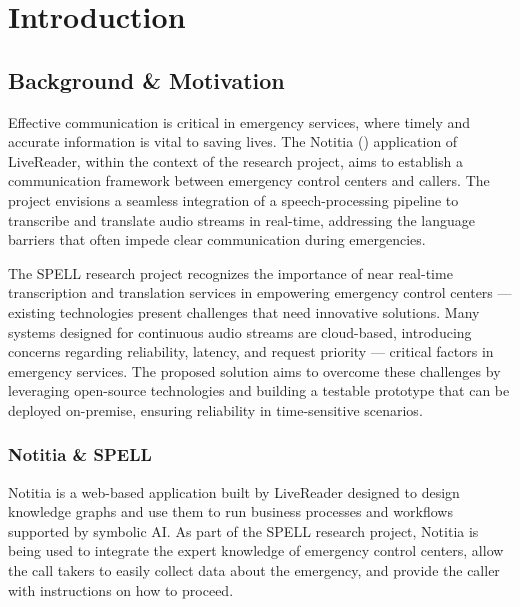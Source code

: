 \chapter{Introduction}

\label{Introduction}


\section{Background \& Motivation}

Effective communication is critical in emergency services, where timely and accurate information is vital to 
saving lives. The Notitia (\cite{notitia2023}) application of LiveReader, within the context of the 
\cite{spell2023} research project, aims to establish a communication framework between 
emergency control centers and callers. The project envisions a seamless integration of a speech-processing pipeline to 
transcribe and translate audio streams in real-time, addressing the language barriers that often impede clear 
communication during emergencies.

The SPELL research project recognizes the importance of near real-time transcription and translation services in 
empowering emergency control centers — existing technologies present challenges that need innovative solutions. 
Many systems designed for continuous audio streams are cloud-based, introducing concerns regarding reliability, 
latency, and request priority — critical factors in emergency services. The proposed solution aims to 
overcome these challenges by leveraging open-source technologies and building a testable prototype that can be deployed 
on-premise, ensuring reliability in time-sensitive scenarios.

\subsection{Notitia \& SPELL}

Notitia is a web-based application built by LiveReader designed to design knowledge graphs and use them to run business 
processes and workflows supported by symbolic AI. As part of the SPELL research project, Notitia is being used to 
integrate the expert knowledge of emergency control centers, allow the call takers to easily collect data about the 
emergency, and provide the caller with instructions on how to proceed.

